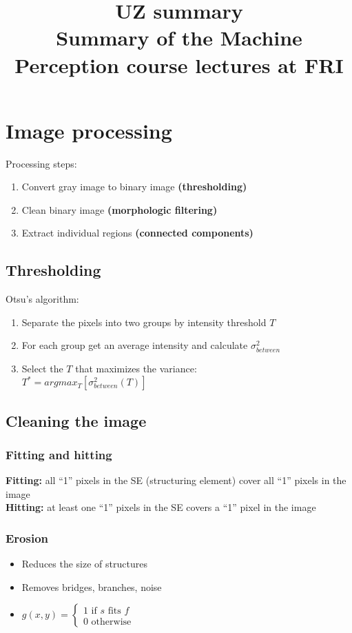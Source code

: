\documentclass{article}
\title{
    UZ summary \\
    \large Summary of the Machine Perception course lectures at FRI
}
\begin{document}
\maketitle
\newpage
\tableofcontents
\newpage

\section{Image processing}

Processing steps:
\begin{enumerate}
    \item Convert gray image to binary image \textbf{(thresholding)}
    \item Clean binary image \textbf{(morphologic filtering)}
    \item Extract individual regions \textbf{(connected components)}
\end{enumerate}

    \subsection{Thresholding}
    Otsu's algorithm:
    \begin{enumerate}
        \item Separate the pixels into two groups by intensity threshold $T$
        \item For each group get an average intensity and calculate $\sigma^{2}_{between}$
        \item Select the $T$ that maximizes the variance: \\
                  $T^* = argmax_T[ \sigma^{2}_{between}(T) ]$
    \end{enumerate}

    \subsection{Cleaning the image}
    
        \subsubsection{Fitting and hitting}
        \textbf{Fitting:} all ``1'' pixels in the SE (structuring element) cover all ``1'' pixels in the image \\ 
        \textbf{Hitting:} at least one ``1'' pixels in the SE covers a ``1'' pixel in the image

        \subsubsection{Erosion}
        \begin{itemize}
            \item Reduces the size of structures
            \item Removes bridges, branches, noise
            \item $g(x, y) = 
            \begin{cases}
                1 \text{ if } s \text{ fits } f \\
                0 \text{ otherwise }
            \end{cases}$
        \end{itemize}
\end{document}
